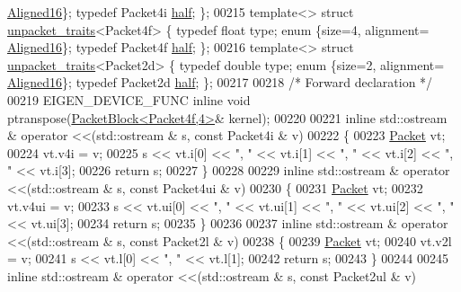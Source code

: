 \begin{DoxyCode}
{      \hyperlink{group__enums_gga45fe06e29902b7a2773de05ba27b47a1af8e2bf74b04c02199f62c5e3c06dbfcc}{Aligned16}\}; \textcolor{keyword}{typedef} Packet4i \hyperlink{struct_eigen_1_1half}{half}; \};
00215 \textcolor{keyword}{template}<> \textcolor{keyword}{struct }\hyperlink{struct_eigen_1_1internal_1_1unpacket__traits}{unpacket\_traits}<Packet4f> \{ \textcolor{keyword}{typedef} \textcolor{keywordtype}{float}  type; \textcolor{keyword}{enum} \{size=4, alignment=
      \hyperlink{group__enums_gga45fe06e29902b7a2773de05ba27b47a1af8e2bf74b04c02199f62c5e3c06dbfcc}{Aligned16}\}; \textcolor{keyword}{typedef} Packet4f \hyperlink{struct_eigen_1_1half}{half}; \};
00216 \textcolor{keyword}{template}<> \textcolor{keyword}{struct }\hyperlink{struct_eigen_1_1internal_1_1unpacket__traits}{unpacket\_traits}<Packet2d> \{ \textcolor{keyword}{typedef} \textcolor{keywordtype}{double} type; \textcolor{keyword}{enum} \{size=2, alignment=
      \hyperlink{group__enums_gga45fe06e29902b7a2773de05ba27b47a1af8e2bf74b04c02199f62c5e3c06dbfcc}{Aligned16}\}; \textcolor{keyword}{typedef} Packet2d \hyperlink{struct_eigen_1_1half}{half}; \};
00217 
00218 \textcolor{comment}{/* Forward declaration */}
00219 EIGEN\_DEVICE\_FUNC \textcolor{keyword}{inline} \textcolor{keywordtype}{void} ptranspose(\hyperlink{struct_eigen_1_1internal_1_1_packet_block}{PacketBlock<Packet4f,4>}& kernel);
00220  
00221 \textcolor{keyword}{inline} std::ostream & operator <<(std::ostream & s, \textcolor{keyword}{const} Packet4i & v)
00222 \{
00223   \hyperlink{union_eigen_1_1internal_1_1_packet}{Packet} vt;
00224   vt.v4i = v;
00225   s << vt.i[0] << \textcolor{stringliteral}{", "} << vt.i[1] << \textcolor{stringliteral}{", "} << vt.i[2] << \textcolor{stringliteral}{", "} << vt.i[3];
00226   \textcolor{keywordflow}{return} s;
00227 \}
00228 
00229 \textcolor{keyword}{inline} std::ostream & operator <<(std::ostream & s, \textcolor{keyword}{const} Packet4ui & v)
00230 \{
00231   \hyperlink{union_eigen_1_1internal_1_1_packet}{Packet} vt;
00232   vt.v4ui = v;
00233   s << vt.ui[0] << \textcolor{stringliteral}{", "} << vt.ui[1] << \textcolor{stringliteral}{", "} << vt.ui[2] << \textcolor{stringliteral}{", "} << vt.ui[3];
00234   \textcolor{keywordflow}{return} s;
00235 \}
00236 
00237 \textcolor{keyword}{inline} std::ostream & operator <<(std::ostream & s, \textcolor{keyword}{const} Packet2l & v)
00238 \{
00239   \hyperlink{union_eigen_1_1internal_1_1_packet}{Packet} vt;
00240   vt.v2l = v;
00241   s << vt.l[0] << \textcolor{stringliteral}{", "} << vt.l[1];
00242   \textcolor{keywordflow}{return} s;
00243 \}
00244 
00245 \textcolor{keyword}{inline} std::ostream & operator <<(std::ostream & s, \textcolor{keyword}{const} Packet2ul & v)
}
\end{DoxyCode}
